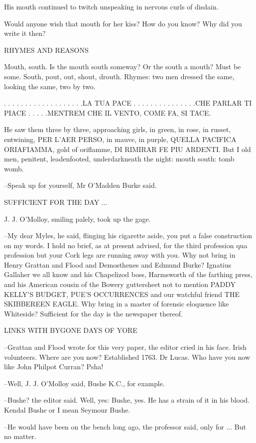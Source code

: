 His mouth continued to twitch unspeaking in nervous curls of disdain.

Would anyone wish that mouth for her kiss? How do you know? Why did
you write it then?


    RHYMES AND REASONS


Mouth, south. Is the mouth south someway? Or the south a mouth?
Must be some. South, pout, out, shout, drouth. Rhymes: two men dressed
the same, looking the same, two by two.


    . . . . . . . . . . . . . . . . . . .LA TUA PACE
    . . . . . . . . . . . . . . .CHE PARLAR TI PIACE
    . . . . .MENTREM CHE IL VENTO, COME FA, SI TACE.


He saw them three by three, approaching girls, in green, in rose, in
russet, entwining, PER L'AER PERSO, in mauve, in purple, QUELLA PACIFICA
ORIAFIAMMA, gold of oriflamme, DI RIMIRAR FE PIU ARDENTI. But I old men,
penitent, leadenfooted, underdarkneath the night: mouth south: tomb womb.

--Speak up for yourself, Mr O'Madden Burke said.


    SUFFICIENT FOR THE DAY ...


J. J. O'Molloy, smiling palely, took up the gage.

--My dear Myles, he said, flinging his cigarette aside, you put a false
construction on my words. I hold no brief, as at present advised, for the
third profession qua profession but your Cork legs are running away with
you. Why not bring in Henry Grattan and Flood and Demosthenes and
Edmund Burke? Ignatius Gallaher we all know and his Chapelizod boss,
Harmsworth of the farthing press, and his American cousin of the Bowery
guttersheet not to mention PADDY KELLY'S BUDGET, PUE'S OCCURRENCES and our
watchful friend THE SKIBBEREEN EAGLE. Why bring in a master of forensic
eloquence like Whiteside? Sufficient for the day is the newspaper thereof.


    LINKS WITH BYGONE DAYS OF YORE


--Grattan and Flood wrote for this very paper, the editor cried in his
face. Irish volunteers. Where are you now? Established 1763. Dr Lucas.
Who have you now like John Philpot Curran? Psha!

--Well, J. J. O'Molloy said, Bushe K.C., for example.

--Bushe? the editor said. Well, yes: Bushe, yes. He has a strain of it in
his blood. Kendal Bushe or I mean Seymour Bushe.

--He would have been on the bench long ago, the professor said, only
for ... But no matter.


